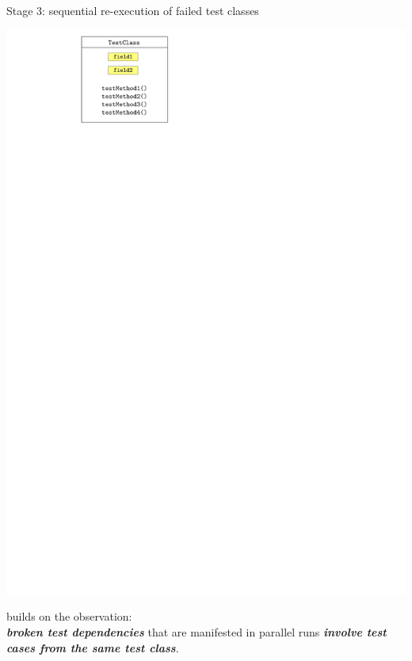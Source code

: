 \documentclass{beamer}
\begin{document}
\begin{frame}{Stage 3: sequential re-execution of failed test classes}
\begin{center}
\begin{minipage}{0.48\linewidth}
			\includegraphics[width=0.85\linewidth,page=2]{images/flakes.pdf}
		\end{minipage}
	\end{center}
\pause
	\textbf{\tname} builds on the observation:\\
{\color{darkred} \textit{\textbf{broken test dependencies}}} that are manifested in parallel runs {\rsm \textit{\textbf{involve test cases from the same test class}}}.
\end{frame}
\end{document}
